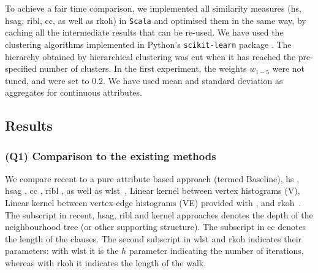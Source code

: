 To achieve a fair time comparison, we implemented all similarity measures (\gls{hs}, \gls{hsag}, \gls{ribl}, \gls{cc}, as well as \gls{rkoh}) in \texttt{Scala} and optimised them in the same way, by caching all the intermediate results that can be re-used.
We have used the clustering algorithms implemented in Python's \texttt{scikit-learn} package \cite{scikit-learn}.
The hierarchy obtained by hierarchical clustering was cut when it has reached the pre-specified number of clusters.
In the first experiment, the weights $w_{1-5}$ were not tuned, and were set to 0.2.
We have used mean and standard deviation as aggregates for continuous attributes.






\subsection{Results}
\label{sec:ResultsSub}



\subsubsection{\textbf{(Q1) Comparison to the existing methods}}

We compare \gls{recent} to a pure attribute based approach (termed Baseline), \gls{hs} \cite{Neville03clusteringrelational}, \gls{hsag} \cite{WitsenburgB11a}, \gls{cc} \cite{Fonseca2012}, \gls{ribl} \cite{RIBL96}, as well as \gls{wlst}~\cite{shervashidze09fastsubtree}, Linear kernel between vertex histograms (V), Linear kernel between vertex-edge histograms (VE) provided with \cite{NIPS2015_5688}, and \gls{rkoh}~\cite{WachmanK07}.
The subscript in \gls{recent}, \gls{hsag}, \gls{ribl} and kernel approaches  denotes the depth of the neighbourhood tree (or other supporting structure).
The subscript in \gls{cc} denotes the length of the clauses.
The second subscript in \gls{wlst} and \gls{rkoh} indicates their parameters: with \gls{wlst} it is the $h$ parameter indicating the number of iterations, whereas with \gls{rkoh} it indicates the length of the walk.




